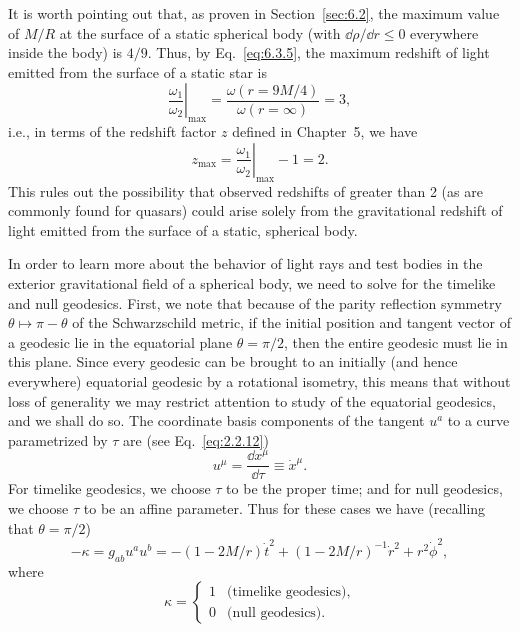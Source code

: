 It is worth pointing out that, as proven in Section~\ref{sec:6.2}, the maximum
value of \(M/R\) at the surface of a static spherical body (with
\(\dd\rho/\dd r\leq0\) everywhere inside the body) is \(4/9\). Thus, by
Eq.~\eqref{eq:6.3.5}, the maximum redshift of light emitted from the surface of a
static star is
\begin{equation}
  \left.\frac{\omega_1}{\omega_2}\right|_{\max}
  =\frac{\omega(r=9M/4)}{\omega(r=\infty)}=3,
  \tag{6.3.7}\label{eq:6.3.7}
\end{equation}
i.e., in terms of the redshift factor \(z\) defined in Chapter~5, we have
\begin{equation}
  z_{\max}=\left.\frac{\omega_1}{\omega_2}\right|_{\max}-1=2.
  \tag{6.3.8}\label{eq:6.3.8}
\end{equation}
This rules out the possibility that observed redshifts of greater than 2 (as are
commonly found for quasars) could arise solely from the gravitational redshift of
light emitted from the surface of a static, spherical body.

In order to learn more about the behavior of light rays and test bodies in the
exterior gravitational field of a spherical body, we need to solve for the
timelike and null geodesics. First, we note that because of the parity reflection
symmetry \(\theta\mapsto\pi-\theta\) of the Schwarzschild metric, if the initial
position and tangent vector of a geodesic lie in the equatorial plane
\(\theta=\pi/2\), then the entire geodesic must lie in this plane. Since every
geodesic can be brought to an initially (and hence everywhere) equatorial
geodesic by a rotational isometry, this means that without loss of generality we
may restrict attention to study of the equatorial geodesics, and we shall do so.
The coordinate basis components of the tangent \(u^a\) to a curve parametrized by
\(\tau\) are (see Eq.~\eqref{eq:2.2.12})
\begin{equation}
  u^\mu=\frac{\dd x^\mu}{\dd\tau}\equiv\dot x^\mu.
  \tag{6.3.9}\label{eq:6.3.9}
\end{equation}
For timelike geodesics, we choose \(\tau\) to be the proper time; and for null
geodesics, we choose \(\tau\) to be an affine parameter. Thus for these cases we
have (recalling that \(\theta=\pi/2\))
\begin{equation}
  -\kappa=g_{ab}u^au^b
  =-(1-2M/r)\dot t^2+(1-2M/r)^{-1}\dot r^2+r^2\dot\phi^2,
  \tag{6.3.10}\label{eq:6.3.10}
\end{equation}
where
\begin{equation}
  \kappa=
  \begin{cases}
    1 & \text{(timelike geodesics)},\\
    0 & \text{(null geodesics)}.
  \end{cases}
  \tag{6.3.11}\label{eq:6.3.11}
\end{equation}

